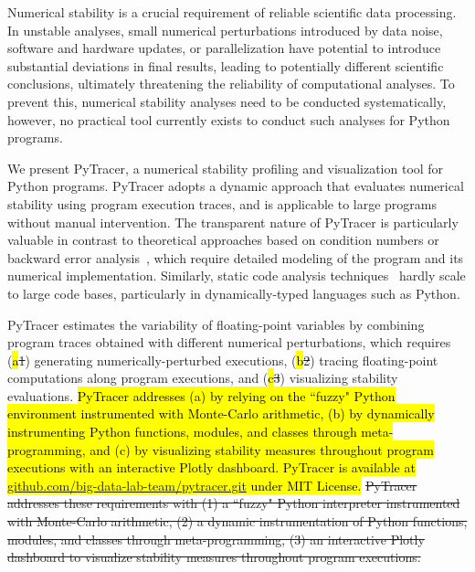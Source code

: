 \documentclass[10pt,journal,compsoc]{IEEEtran}
\newcommand{\pytracer}[0]{PyTracer\xspace}
\DeclareRobustCommand{\add}[1]{\sethlcolor{lightgreen}\hl{#1}}
\DeclareRobustCommand{\remove}[1]{\textcolor{lightred}{\sout{#1}}}
\DeclareRobustCommand{\addCite}[1]{\textcolor{lightgreen}{\mbox{#1}}}
\DeclareRobustCommand{\add}[1]{#1}
\DeclareRobustCommand{\remove}[1]{}
\DeclareRobustCommand{\addCite}[1]{#1}
\begin{document}
Numerical stability is a crucial requirement of reliable scientific data
processing. In unstable analyses, small numerical perturbations introduced by
data noise, software and hardware updates, or parallelization have potential to
introduce substantial deviations in final results, leading to potentially
different scientific conclusions, ultimately threatening the reliability of
computational analyses. To prevent this, numerical stability analyses need to be
conducted systematically, however, no practical tool currently exists to conduct
such analyses for Python programs.

We present PyTracer, a numerical stability profiling and visualization tool for
Python programs. \pytracer adopts a dynamic approach that evaluates numerical
stability using program execution traces, and is applicable to large programs
without manual intervention. The transparent nature of \pytracer is particularly
valuable in contrast to theoretical approaches based on condition numbers or
backward error analysis~\addCite{\cite{higham2002accuracy}}, which require
detailed modeling of the program and its numerical implementation. Similarly,
static code analysis techniques~\addCite{\cite{goubault2006static}} hardly scale
to large code bases, particularly in dynamically-typed languages such as Python.

\pytracer estimates the variability of floating-point variables by combining
program traces obtained with different numerical perturbations, which requires
(\add{a}\remove{1}) generating numerically-perturbed executions,
(\add{b}\remove{2}) tracing floating-point computations along program
executions, and (\add{c}\remove{3}) visualizing stability evaluations.
\add{PyTracer addresses (a) by relying on the ``fuzzy" Python environment instrumented with Monte-Carlo
    arithmetic, (b) by dynamically instrumenting Python functions,
    modules, and classes through meta-programming, and (c) by visualizing stability measures throughout program executions
    with an interactive Plotly
    dashboard.
    \mbox{\pytracer} is available at
    \mbox{\href{https://github.com/big-data-lab-team/pytracer.git}{github.com/big-data-lab-team/pytracer.git}}
    under MIT License.} \remove{\mbox{\pytracer} addresses these requirements with
    (1) a ``fuzzy" Python interpreter instrumented with Monte-Carlo arithmetic, (2)
    a dynamic instrumentation of Python functions, modules, and classes through
    meta-programming, (3) an interactive Plotly dashboard to visualize stability
    measures throughout program executions. }
\end{document}
